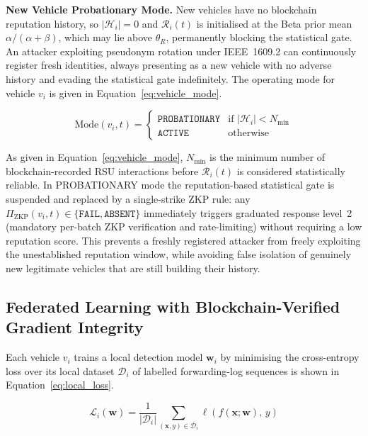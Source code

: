 \documentclass[12pt, a4paper]{report}
\newcommand{\mypar}{\vspace{0.8em}\noindent}
\begin{document}
\mypar
\textbf{New Vehicle Probationary Mode.}
New vehicles have no blockchain reputation history, so
$|\mathcal{H}_i|=0$ and $\mathcal{R}_i(t)$ is initialised at the
Beta prior mean $\alpha/(\alpha+\beta)$, which may lie above
$\theta_R$, permanently blocking the statistical gate. An attacker
exploiting pseudonym rotation under IEEE~1609.2 can continuously
register fresh identities, always presenting as a new vehicle with
no adverse history and evading the statistical gate indefinitely.
The operating mode for vehicle $v_i$ is given in
Equation~\eqref{eq:vehicle_mode}.

\begin{equation}
\label{eq:vehicle_mode}
\mathrm{Mode}(v_i, t) =
\begin{cases}
\texttt{PROBATIONARY}
  & \text{if } |\mathcal{H}_i| < N_{\text{min}} \\[4pt]
\texttt{ACTIVE}
  & \text{otherwise}
\end{cases}
\end{equation}

As given in Equation~\eqref{eq:vehicle_mode}, $N_{\text{min}}$
is the minimum number of blockchain-recorded RSU interactions
before $\mathcal{R}_i(t)$ is considered statistically reliable.
In PROBATIONARY mode the reputation-based statistical gate is
suspended and replaced by a single-strike ZKP rule: any
$\Pi_{\text{ZKP}}(v_i,t) \in \{\texttt{FAIL}, \texttt{ABSENT}\}$
immediately triggers graduated response level~2 (mandatory
per-batch ZKP verification and rate-limiting) without requiring
a low reputation score. This prevents a freshly registered
attacker from freely exploiting the unestablished reputation
window, while avoiding false isolation of genuinely new
legitimate vehicles that are still building their history.

\subsection{Federated Learning with Blockchain-Verified Gradient Integrity}

Each vehicle $v_i$ trains a local detection model $\mathbf{w}_i$ by minimising
the cross-entropy loss over its local dataset $\mathcal{D}_i$ of labelled
forwarding-log sequences is shown in Equation~\eqref{eq:local_loss}.

\begin{equation}
\label{eq:local_loss}
\mathcal{L}_i(\mathbf{w}) = \frac{1}{|\mathcal{D}_i|}
\sum_{(\mathbf{x},y)\in\mathcal{D}_i}
\ell\!\left(f(\mathbf{x};\mathbf{w}),\, y\right)
\end{equation}
\end{document}
